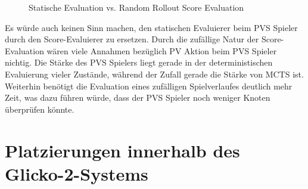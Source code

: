 \vspace*{0.2cm}
\begin{figure}[!ht]
    \centering
    \caption[Statische Evaluation vs. Score Evaluation]{Statische Evaluation vs. Random Rollout Score Evaluation}
    \label{fig:greedy-static-greedy-score-comparison}
\end{figure}
\vspace*{0.1cm}

Es würde auch keinen Sinn machen, den statischen Evaluierer beim \ac{PVS} Spieler durch den Score-Evaluierer zu ersetzen. Durch die zufällige Natur der Score-Evaluation wären viele Annahmen bezüglich \ac{PV} Aktion beim \ac{PVS} Spieler nichtig. Die Stärke des \ac{PVS} Spielers liegt gerade in der deterministischen Evaluierung vieler Zustände, während der Zufall gerade die Stärke von \ac{MCTS} ist. Weiterhin benötigt die Evaluation eines zufälligen Spielverlaufes deutlich mehr Zeit, was dazu führen würde, dass der \ac{PVS} Spieler noch weniger Knoten überprüfen könnte.

\pagebreak

\section{Platzierungen innerhalb des Glicko-2-Systems}

